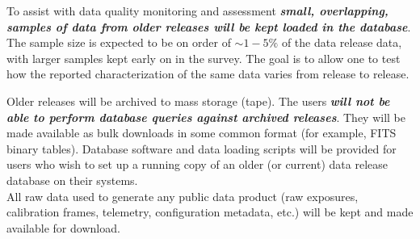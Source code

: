 \documentclass[12pt]{article}
\begin{document}
To assist with data quality monitoring and assessment {\bf \em small, overlapping, samples of data from older releases will be kept loaded in the database}. The sample size is expected to be on order of $\sim 1-5\%$ of the data release data, with larger samples kept early on in the survey. The goal is to allow one to test how the reported characterization of the same data varies from release to release.

Older releases will be archived to mass storage (tape). The users {\bf \em will not be able to perform database queries against archived releases}. They will be made available as bulk downloads in some common format (for example, FITS binary tables). Database software and data loading scripts will be provided for users who wish to set up a running copy of an older (or current) data release database on their systems.
\\

All raw data used to generate any public data product (raw exposures, calibration frames, telemetry, configuration metadata, etc.) will be kept and made available for download.
\end{document}
